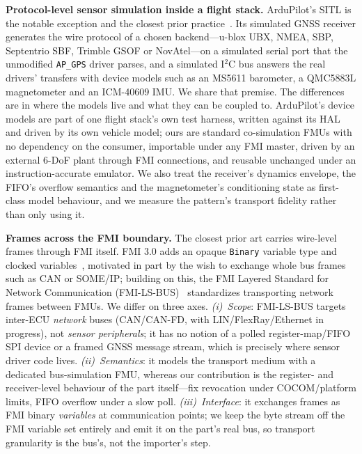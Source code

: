 \documentclass[preprint,12pt,a4paper]{elsarticle}
\newcommand{\code}[1]{\texttt{\small #1}}
\begin{document}
\textbf{Protocol-level sensor simulation inside a flight stack.} ArduPilot's
SITL is the notable exception and the closest prior practice~\cite{ardupilot_sitl}.
Its simulated GNSS receiver generates the wire protocol of a chosen
backend---u-blox UBX, NMEA, SBP, Septentrio SBF, Trimble GSOF or NovAtel---on a
simulated serial port that the unmodified \code{AP\_GPS} driver parses, and a
simulated I$^2$C bus answers the real drivers' transfers with device models
such as an MS5611 barometer, a QMC5883L magnetometer and an ICM-40609 IMU. We
share that premise. The differences are in where the models live and what they
can be coupled to. ArduPilot's device models are part of one flight stack's own
test harness, written against its HAL and driven by its own vehicle model; ours
are standard co-simulation FMUs with no dependency on the consumer, importable
under any FMI master, driven by an external 6-DoF plant through FMI
connections, and reusable unchanged under an instruction-accurate emulator. We
also treat the receiver's dynamics envelope, the FIFO's overflow semantics and
the magnetometer's conditioning state as first-class model behaviour, and we
measure the pattern's transport fidelity rather than only using it.

\textbf{Frames across the FMI boundary.} The closest prior art carries
wire-level frames through FMI itself. FMI 3.0 adds an opaque \code{Binary}
variable type and clocked variables~\cite{junghanns2022fmi3}, motivated in part
by the wish to exchange whole bus frames such as CAN or SOME/IP; building on
this, the FMI Layered Standard for Network Communication
(FMI-LS-BUS)~\cite{fmilsbus2025} standardizes transporting network frames
between FMUs. We differ on three axes. \emph{(i)~Scope}: FMI-LS-BUS targets
inter-ECU \emph{network} buses (CAN/CAN-FD, with LIN/FlexRay/Ethernet in
progress), not \emph{sensor peripherals}; it has no notion of a polled
register-map/FIFO SPI device or a framed GNSS message stream, which is precisely
where sensor driver code lives. \emph{(ii)~Semantics}: it models the transport
medium with a dedicated bus-simulation FMU, whereas our contribution is the
register- and receiver-level behaviour of the part itself---fix revocation under
COCOM/platform limits, FIFO overflow under a slow poll. \emph{(iii)~Interface}:
it exchanges frames as FMI binary \emph{variables} at communication points; we
keep the byte stream off the FMI variable set entirely and emit it on the part's
real bus, so transport granularity is the bus's, not the importer's step.
\end{document}
